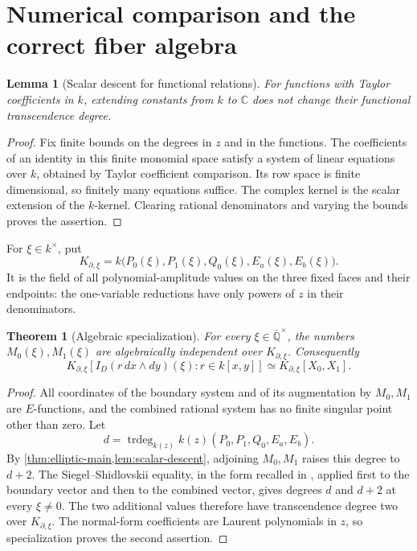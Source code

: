 \documentclass[11pt]{article}
\numberwithin{equation}{section}
\newtheorem{theorem}{Theorem}[section]
\newtheorem{lemma}[lemma]{Lemma}
\theoremstyle{definition}
\theoremstyle{remark}
\newcommand{\C}{\mathbb C}
\newcommand{\Q}{\mathbb Q}
\newcommand{\trdeg}{\operatorname{trdeg}}
\begin{document}
\section{Numerical comparison and the correct fiber algebra}
\begin{lemma}[Scalar descent for functional relations]\label{lem:scalar-descent}
For functions with Taylor coefficients in $k$, extending constants from
$k$ to $\C$ does not change their functional transcendence degree.
\end{lemma}
\begin{proof}
Fix finite bounds on the degrees in $z$ and in the functions. The
coefficients of an identity in this finite monomial space satisfy a system
of linear equations over $k$, obtained by Taylor coefficient comparison.
Its row space is finite dimensional, so finitely many equations suffice.
The complex kernel is the scalar extension of the $k$-kernel. Clearing
rational denominators and varying the bounds proves the assertion.
\end{proof}


For $\xi\in k^\times$, put
\[
 K_{\partial,\xi}
 =k\bigl(P_0(\xi),P_1(\xi),Q_0(\xi),E_a(\xi),E_b(\xi)\bigr).
\]
It is the field of all polynomial-amplitude values on the three fixed faces
and their endpoints: the one-variable reductions have only powers of $z$
in their denominators.

\begin{theorem}[Algebraic specialization]\label{thm:values}
For every $\xi\in\overline{\Q}^{\times}$, the numbers
$M_0(\xi),M_1(\xi)$ are algebraically independent over
$K_{\partial,\xi}$. Consequently
\[
 K_{\partial,\xi}[I_D(r\,dx\wedge dy)(\xi):r\in k[x,y]]
 \simeq K_{\partial,\xi}[X_0,X_1].
\]
\end{theorem}
\begin{proof}
All coordinates of the boundary system and of its augmentation by
$M_0,M_1$ are $E$-functions, and the combined rational system has no finite
singular point other than zero. Let
\[
 d=\trdeg_{k(z)} k(z)(P_0,P_1,Q_0,E_a,E_b).
\]
By \cref{thm:elliptic-main,lem:scalar-descent}, adjoining $M_0,M_1$ raises this degree to
$d+2$. The Siegel--Shidlovskii equality, in the form recalled in
\cite[Theorem 1.1]{Beukers}, applied first to the boundary vector and then
to the combined vector, gives degrees $d$ and $d+2$ at every
$\xi\ne0$. The two additional values therefore have transcendence degree
two over $K_{\partial,\xi}$. The normal-form coefficients are Laurent
polynomials in $z$, so specialization proves the second assertion.
\end{proof}
\end{document}
